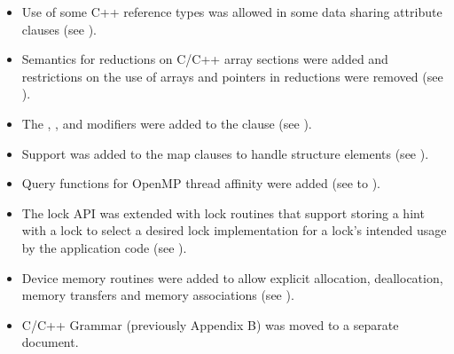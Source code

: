 \begin{itemize}
\item Use of some C++ reference types was allowed in some data sharing 
      attribute clauses (see ).

\item Semantics for reductions on C/C++ array sections were added and 
      restrictions on the use of arrays and pointers in reductions were 
      removed (see ).
      
\item The , , and  modifiers were added to the
       clause (see ).
      
\item Support was added to the map clauses to handle structure elements 
	(see ).
	  
\item Query functions for OpenMP thread affinity were added (see 
       to ).

\item The lock API was extended with lock routines that support storing a hint
      with a lock to select a desired lock implementation for a lock's intended usage
      by the application code (see ).

\item Device memory routines were added to allow explicit allocation, 
      deallocation, memory transfers and memory associations (see
      ).

\item C/C++ Grammar (previously Appendix B) was moved to a separate document. 
\end{itemize}



